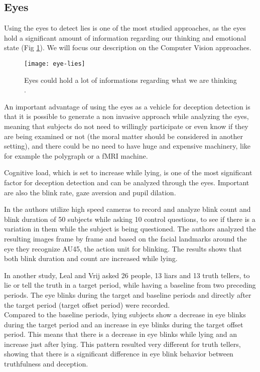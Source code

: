 \clearpage
 
\subsection{Eyes}
Using the eyes to detect lies is one of the most studied approaches, as the eyes hold a significant amount of information regarding our thinking and emotional state \cite{FUKUDA2001239} (Fig \ref{fig:eye-lies}). We will focus our description on the Computer Vision approaches.

\begin{figure}[H]
	\centering
	\texttt{[image: eye-lies]}
	\caption{Eyes could hold a lot of informations regarding what we are thinking \cite{eyeLies}.}
	\label{fig:eye-lies}
\end{figure}

An important advantage of using the eyes as a vehicle for deception detection is that it is possible to generate a non invasive approach while analyzing the eyes, meaning that subjects do not need to willingly participate or even know if they are being examined or not (the moral matter should be considered in another setting), and there could be no need to have huge and expensive machinery, like for example the polygraph or a fMRI machine.

Cognitive load, which is set to increase while lying, is one of the most significant factor for deception detection and can be analyzed through the eyes. Important are also the blink rate, gaze aversion and pupil dilation.

In \cite{8125844} the authors utilize high speed cameras to record and analyze blink count and blink duration of 50 subjects while asking 10 control questions, to see if there is a variation in them while the subject is being questioned. The authors analyzed the resulting images frame by frame and based on the facial landmarks around the eye they recognize AU45, the action unit for blinking. The results shows that both blink duration and count are increased while lying.

In another study, Leal and Vrij \cite{Leal2008} asked 26 people, 13 liars and 13 truth tellers, to lie or tell the truth in a target period, while having a baseline from two preceding periods. The eye blinks during the target and baseline periods and directly after the target period (target offset period) were recorded.\\
Compared to the baseline periods, lying subjects show a decrease in eye blinks during the target period and an increase in eye blinks during the target offset period. This means that there is a decrease in eye blinks while lying and an increase just after lying. This pattern resulted very different for truth tellers, showing that there is a significant difference in eye blink behavior between truthfulness and deception.

